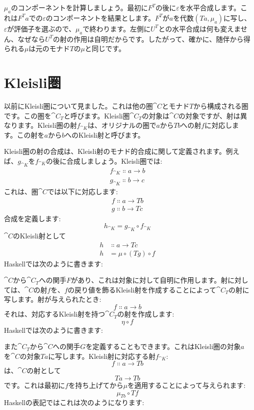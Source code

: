 $\mu_a$のコンポーネントを計算しましょう。最初に$F^T$の後に$\varepsilon$を水平合成します。これは$F^T a$での$\varepsilon$のコンポーネントを結果とします。$F^T$が$a$を代数$(T a, \mu_a)$に写し、$\varepsilon$が評価子を選ぶので、$\mu_a$で終わります。左側に$U^T$との水平合成は何も変えません、なぜなら$U^T$の射の作用は自明だからです。したがって、確かに、随伴から得られる$\mu$は元のモナド$T$の$\mu$と同じです。

\section{Kleisli圏}

以前にKleisli圏について見ました。これは他の圏$\cat{C}$とモナド$T$から構成される圏です。この圏を$\cat{C}_T$と呼びます。Kleisli圏$\cat{C}_T$の対象は$\cat{C}$の対象ですが、射は異なります。Kleisli圏の射$f_{\cat{K}}$は、オリジナルの圏で$a$から$T b$への射$f$に対応します。この射を$a$から$b$へのKleisli射と呼びます。

Kleisli圏の射の合成は、Kleisli射のモナド的合成に関して定義されます。例えば、$g_{\cat{K}}$を$f_{\cat{K}}$の後に合成しましょう。Kleisli圏では: 
\begin{gather*}
  f_{\cat{K}} \Colon a \to b \\
  g_{\cat{K}} \Colon b \to c
\end{gather*}
これは、圏$\cat{C}$では以下に対応します: 
\begin{gather*}
  f \Colon a \to T b \\
  g \Colon b \to T c
\end{gather*}
合成を定義します: 
\[h_{\cat{K}} = g_{\cat{K}} \circ f_{\cat{K}}\]
$\cat{C}$のKleisli射として
\begin{align*}
  h & \Colon a \to T c          \\
  h & = \mu \circ (T g) \circ f
\end{align*}
Haskellでは次のように書きます: 

$\cat{C}$から$\cat{C}_T$への関手$F$があり、これは対象に対して自明に作用します。射に対しては、$\cat{C}$の射$f$を、$f$の戻り値を飾るKleisli射を作成することによって$\cat{C}_T$の射に写します。射が与えられたとき: 
\[f \Colon a \to b\]
それは、対応するKleisli射を持つ$\cat{C}_T$の射を作成します: 
\[\eta \circ f\]
Haskellでは次のように書きます: 

また$\cat{C}_T$から$\cat{C}$への関手$G$を定義することもできます。これはKleisli圏の対象$a$を$\cat{C}$の対象$T a$に写します。Kleisli射に対応する射$f_{\cat{K}}$: 
\[f \Colon a \to T b\]
は、$\cat{C}$の射として
\[T a \to T b\]
です。これは最初に$f$を持ち上げてから$\mu$を適用することによって与えられます: 
\[\mu_{T b} \circ T f\]
Haskellの表記ではこれは次のようになります: 


